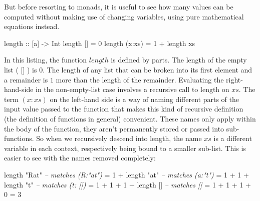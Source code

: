 \documentclass[]{article}
\newenvironment{Shaded}{}{}
\newcommand{\DataTypeTok}[1]{\textcolor[rgb]{0.56,0.13,0.00}{{#1}}}
\newcommand{\DecValTok}[1]{\textcolor[rgb]{0.25,0.63,0.44}{{#1}}}
\newcommand{\StringTok}[1]{\textcolor[rgb]{0.25,0.44,0.63}{{#1}}}
\newcommand{\CommentTok}[1]{\textcolor[rgb]{0.38,0.63,0.69}{\textit{{#1}}}}
\newcommand{\OtherTok}[1]{\textcolor[rgb]{0.00,0.44,0.13}{{#1}}}
\newcommand{\FunctionTok}[1]{\textcolor[rgb]{0.02,0.16,0.49}{{#1}}}
\newcommand{\NormalTok}[1]{{#1}}
\begin{document}
But before resorting to monads, it is useful to see how many values can
be computed without making use of changing variables, using pure
mathematical equations instead.

\singlespacing

\begin{Shaded}
\begin{Highlighting}[]
\NormalTok{length}\OtherTok{ ::} \NormalTok{[a]    }\OtherTok{->} \DataTypeTok{Int}
\NormalTok{length    []     }\FunctionTok{=}  \DecValTok{0}
\NormalTok{length    (x}\FunctionTok{:}\NormalTok{xs) }\FunctionTok{=}  \DecValTok{1} \FunctionTok{+} \NormalTok{length xs}
\end{Highlighting}
\end{Shaded}

\doublespacing

In this listing, the function \(length\) is defined by parts. The length
of the empty list ( {[}{]} ) is \(0\). The length of any list that can
be broken into its first element and a remainder is \(1\) more than the
length of the remainder. Evaluating the right-hand-side in the
non-empty-list case involves a recursive call to length on \(xs\). The
term \((x:xs)\) on the left-hand side is a way of naming different parts
of the input value passed to the function that makes this kind of
recursive definition (the definition of functions in general)
convenient. These names only apply within the body of the function, they
aren't permanently stored or passed into sub-functions. So when we
recursively descend into length, the name \(xs\) is a different variable
in each context, respectively being bound to a smaller sub-list. This is
easier to see with the names removed completely:

\singlespacing

\begin{Shaded}
\begin{Highlighting}[]
  \NormalTok{length }\StringTok{"Rat"}           \CommentTok{-- matches (R:"at")}
\FunctionTok{=} \DecValTok{1} \FunctionTok{+} \NormalTok{length }\StringTok{"at"}        \CommentTok{-- matches (a:"t")}
\FunctionTok{=} \DecValTok{1} \FunctionTok{+} \DecValTok{1} \FunctionTok{+} \NormalTok{length }\StringTok{"t"}     \CommentTok{-- matches (t: [])}
\FunctionTok{=} \DecValTok{1} \FunctionTok{+} \DecValTok{1} \FunctionTok{+} \DecValTok{1} \FunctionTok{+} \NormalTok{length []  }\CommentTok{-- matches []}
\FunctionTok{=} \DecValTok{1} \FunctionTok{+} \DecValTok{1} \FunctionTok{+} \DecValTok{1} \FunctionTok{+} \DecValTok{0}
\FunctionTok{=} \DecValTok{3}
\end{Highlighting}
\end{Shaded}
\end{document}
